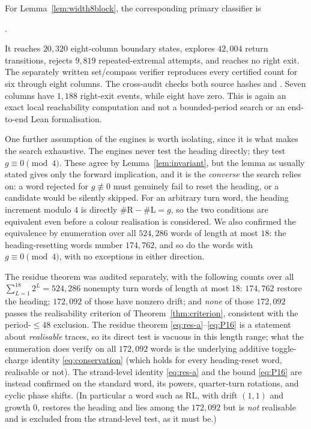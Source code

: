 \documentclass[11pt,letterpaper]{article}
\theoremstyle{plain}
\theoremstyle{definition}
\newcommand{\growth}{g}
\newcommand{\turnR}{\mathrm{R}}
\newcommand{\turnL}{\mathrm{L}}
\begin{document}
\begin{NoHyper}
For Lemma~\ref{lem:width8block}, the corresponding primary classifier is
\begin{center}
.
\end{center}
It reaches $20{,}320$ eight-column boundary states, explores $42{,}004$ return
transitions, rejects $9{,}819$ repeated-extremal attempts, and reaches no right
exit.  The separately written set/compass verifier
reproduces every certified count for six through eight columns.  The cross-audit
 checks both source hashes
and .  Seven
columns have $1{,}188$ right-exit events, while eight have zero.  This is again an
exact local reachability computation and not a bounded-period search or an
end-to-end Lean formalisation.

One further assumption of the engines is worth isolating, since it is what makes the
search exhaustive. The engines never test the heading directly; they test
$\growth\equiv0\pmod4$. These agree by Lemma~\ref{lem:invariant}, but the lemma as
usually stated gives only the forward implication, and it is the \emph{converse} the
search relies on: a word rejected for $\growth\not\equiv0$ must genuinely fail to
reset the heading, or a candidate would be silently skipped. For an arbitrary turn
word, the heading increment modulo $4$ is directly
$\#\turnR-\#\turnL=\growth$, so the two conditions are equivalent even before a
colour realisation is considered. We also confirmed the equivalence by enumeration over all
$524{,}286$ words of length at most $18$: the heading-resetting words number
$174{,}762$, and so do the words with $\growth\equiv0\pmod4$, with no exceptions in
either direction.

The residue theorem was audited separately, with the following counts over all
$\sum_{L=1}^{18}2^{L}=524{,}286$ nonempty turn words of length at most $18$:
$174{,}762$ restore the heading; $172{,}092$ of those have nonzero drift; and
\emph{none} of those $172{,}092$ passes the realisability criterion of
Theorem~\ref{thm:criterion}, consistent with the period-$\le48$ exclusion. The
residue theorem \eqref{eq:res-a}--\eqref{eq:P16} is a statement about \emph{realisable}
traces, so its direct test is vacuous in this length range; what the enumeration does
verify on all $172{,}092$ words is the underlying additive toggle-charge identity
\eqref{eq:conservation} (which holds for every heading-reset word, realisable or not).
The strand-level identity \eqref{eq:res-a} and the bound \eqref{eq:P16} are instead
confirmed on the standard word, its powers, quarter-turn rotations, and cyclic phase
shifts. (In
particular a word such as $\turnR\turnL$, with drift $(1,1)$ and growth $0$, restores
the heading and lies among the $172{,}092$ but is \emph{not} realisable and is
excluded from the strand-level test, as it must be.)


\end{NoHyper}
\end{document}
